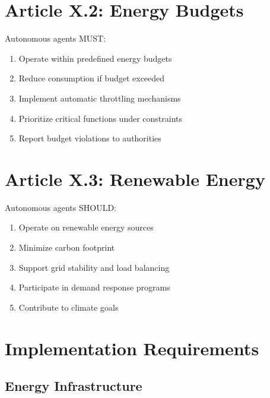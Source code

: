 \section{Article X.2: Energy Budgets}

\begin{articlebox}
Autonomous agents MUST:
\begin{enumerate}
    \item Operate within predefined energy budgets
    \item Reduce consumption if budget exceeded
    \item Implement automatic throttling mechanisms
    \item Prioritize critical functions under constraints
    \item Report budget violations to authorities
\end{enumerate}
\end{articlebox}

\vspace{0.5cm}

\section{Article X.3: Renewable Energy}

\begin{articlebox}
Autonomous agents SHOULD:
\begin{enumerate}
    \item Operate on renewable energy sources
    \item Minimize carbon footprint
    \item Support grid stability and load balancing
    \item Participate in demand response programs
    \item Contribute to climate goals
\end{enumerate}
\end{articlebox}

\vspace{0.5cm}

\section{Implementation Requirements}

\subsection{Energy Infrastructure}


